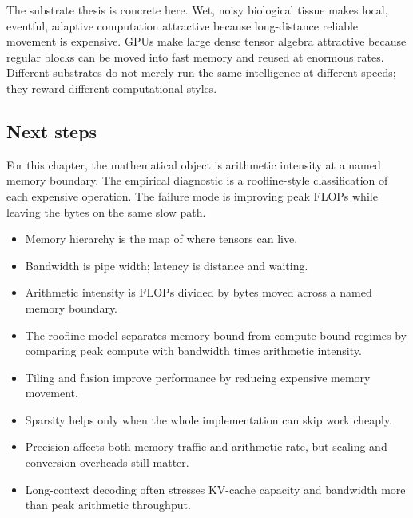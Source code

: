 The substrate thesis is concrete here. Wet, noisy biological tissue makes local, eventful, adaptive computation attractive because long-distance reliable movement is expensive. GPUs make large dense tensor algebra attractive because regular blocks can be moved into fast memory and reused at enormous rates. Different substrates do not merely run the same intelligence at different speeds; they reward different computational styles.

\subsection{Next steps}

For this chapter, the mathematical object is arithmetic intensity at a named memory boundary. The empirical diagnostic is a roofline-style classification of each expensive operation. The failure mode is improving peak FLOPs while leaving the bytes on the same slow path.

\begin{chaptersummary}
\begin{itemize}[leftmargin=*]
  \item Memory hierarchy is the map of where tensors can live.
  \item Bandwidth is pipe width; latency is distance and waiting.
  \item Arithmetic intensity is FLOPs divided by bytes moved across a named memory boundary.
  \item The roofline model separates memory-bound from compute-bound regimes by comparing peak compute with bandwidth times arithmetic intensity.
  \item Tiling and fusion improve performance by reducing expensive memory movement.
  \item Sparsity helps only when the whole implementation can skip work cheaply.
  \item Precision affects both memory traffic and arithmetic rate, but scaling and conversion overheads still matter.
  \item Long-context decoding often stresses KV-cache capacity and bandwidth more than peak arithmetic throughput.
\end{itemize}
\end{chaptersummary}

